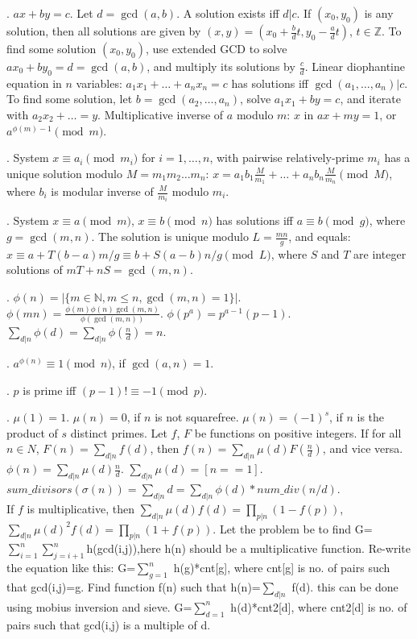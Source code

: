 . $ax+by=c$.
Let $d=\gcd(a,b)$. A solution exists iff $d|c$.
If $(x_0,y_0)$ is any solution, then all solutions are given by
$(x,y) = (x_0 + \frac{b}{d}t, y_0 - \frac{a}{d}t)$, $t \in {\mathbb Z}$.
To find some solution $(x_0, y_0)$, use extended GCD to solve
$ax_0 + by_0 = d = \gcd(a, b)$, and multiply its solutions by $\frac{c}{d}$.
Linear diophantine equation in $n$ variables:
$a_1 x_1 + \dots + a_n x_n = c$ has solutions iff $\gcd(a_1, \dots, a_n) | c$.
To find some solution, let $b=\gcd(a_2, \dots, a_n)$,
solve $a_1 x_1 + by = c$, and iterate with $a_2 x_2 + \dots = y$.
Multiplicative inverse of $a$ modulo $m$:
$x$ in $ax + my = 1$, or $a^{\phi(m)-1} \pmod{m}$.

.
System $x \equiv a_i \pmod{m_i}$ for $i=1,\dots,n$, with
pairwise relatively-prime $m_i$ has a unique solution modulo $M = m_1 m_2 \dots m_n$:
$x = a_1 b_1 \frac{M}{m_1} + \dots + a_n b_n \frac{M}{m_n} \pmod{M}$,
where $b_i$ is modular inverse of $\frac{M}{m_i}$ modulo $m_i$.
 
.
System $x \equiv a \pmod{m}$, $x \equiv b \pmod{n}$ has solutions
iff $a \equiv b \pmod{g}$, where $g=\gcd(m,n)$.
The solution is unique modulo $L=\frac{mn}{g}$, and equals:
$x \equiv a + T(b-a) m/g \equiv b + S(a-b) n/g \pmod{L}$,
where $S$ and $T$ are integer solutions of $mT + nS = \gcd(m,n)$.
 
.
$\phi(n)=|\{m \in {\mathbb N}, m \le n, \gcd(m, n) = 1 \}|$. \\
$\phi(mn) = \frac{\phi(m) \phi(n) \gcd(m,n)}{\phi(\gcd(m,n))}$. \quad
$\phi(p^a) = p^{a-1} (p-1)$. \quad
$\sum_{d|n} \phi(d) = \sum_{d|n} \phi(\frac{n}{d}) = n$.
 
. $a^{\phi(n)} \equiv 1\pmod{n}$, if $\gcd(a,n)=1$.
 
. $p$ is prime iff $(p - 1)! \equiv -1 \pmod p$.
 
.
$\mu(1) = 1$. $\mu(n) = 0$, if $n$ is not squarefree.
$\mu(n) = (-1)^s$, if $n$ is the product of $s$ distinct primes.
Let $f$, $F$ be functions on positive integers.
If for all $n \in N$, $F(n)=\sum_{d|n} f(d)$, then $f(n) = \sum_{d|n} \mu(d) F(\frac{n}{d})$,
and vice versa. \quad
$\phi(n) = \sum_{d|n} \mu(d) \frac{n}{d}$.
\quad $\sum_{d|n} \mu(d) = [n==1]. 
$$sum\_divisors(\sigma(n)) = \sum_{d|n} d = \sum_{d|n} \phi(d) * num\_div(n/d)$. \\
If $f$ is multiplicative, then $\sum_{d|n} \mu(d) f(d) = \prod_{p|n}(1-f(p))$,
$\sum_{d|n} \mu(d)^2 f(d) = \prod_{p|n} (1+f(p))$.
Let the problem be to find G=$\sum_{i=1}^n \sum_{j=i+1}^n $h(gcd(i,j)),here h(n) should be a multiplicative function.
Re-write the equation like this:  G=$\sum_{g=1}^n$ h(g)*cnt[g], where cnt[g] is no. of pairs such that gcd(i,j)=g.
Find function f(n) such that h(n)=$\sum_{d|n}$ f(d). this can be done using mobius inversion and sieve.
G=$\sum_{d=1}^n$ h(d)*cnt2[d], where cnt2[d] is no. of pairs such that gcd(i,j) is a multiple of d.
 
